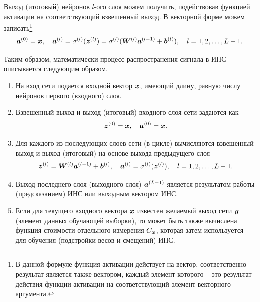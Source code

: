 \documentclass[a4paper,12pt,russian]{article} %
\begin{document}
Выход (итоговый) нейронов $l$-ого слоя можем получить, подействовав функцией активации на соответствующий взвешенный выход.
В векторной форме можем записать\footnote{
	В данной формуле функция активации действует на вектор, соответственно результат является также вектором, каждый элемент которого -- это результат действия функции активации на соответствующий элемент векторного аргумента.
}
\begin{equation} \label{ss:review_nn_def_a}
	\bm{a}^{(0)} = \bm{x}, \quad
	\bm{a}^{(l)} = \sigma^{(l)} (\bm{z}^{(l)}) = \sigma^{(l)} (\bm{W}^{(l)} \bm{a}^{(l-1)} + \bm{b}^{(l)}), \quad
	l = 1, 2, \ldots, L-1.
\end{equation}

Таким образом, математически процесс распространения сигнала в ИНС описывается следующим образом.
\begin{enumerate}
	\item
		На вход сети подается входной вектор $\bm{x}$, имеющий длину, равную числу нейронов первого (входного) слоя.
	\item
		Взвешенный выход и выход (итоговый) входного слоя сети задаются как
		$$
			\bm{z}^{(0)} = \bm{x}, \quad
			\bm{a}^{(0)} = \bm{x}.
		$$
	\item
		Для каждого из последующих слоев сети (в цикле) вычисляются взвешенный выход и выход (итоговый) на основе выхода предыдущего слоя
		$$
			\bm{z}^{(l)} = \bm{W}^{(l)} \bm{a}^{(l-1)} + \bm{b}^{(l)}, \quad
			\bm{a}^{(l)} = \sigma^{(l)} (\bm{z}^{(l)}), \quad
			l = 1, 2, \ldots, L-1.
		$$
	\item
		Выход последнего слоя (выходного слоя) $\bm{a}^{(L-1)}$ является результатом работы (предсказанием) ИНС или выходным вектором ИНС.
	\item
		Если для текущего входного вектора $\bm{x}$ известен желаемый выход сети $\bm{y}$ (элемент данных обучающей выборки), то может быть также вычислена функция стоимости отдельного измерения $C_{\bm{x}}$, которая затем используется для обучения (подстройки весов и смещений) ИНС.
\end{enumerate}
\end{document}
